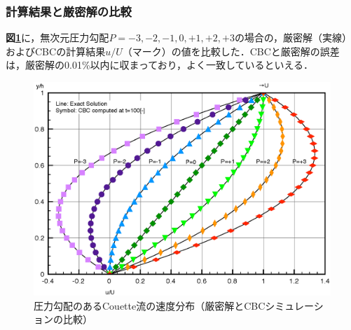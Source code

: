 %
\subsubsection{計算結果と厳密解の比較}
\textbf{図\ref{Fig.couette_exact_100}}に，無次元圧力勾配$P=-3, -2, -1, 0, +1, +2, +3$の場合の，厳密解（実線）およびCBCの計算結果$u/U$（マーク）の値を比較した．CBCと厳密解の誤差は，厳密解の0.01\%以内に収まっており，よく一致しているといえる．


\begin{figure}[htbp]
\begin{center}
\includegraphics[width=14cm]{exact_100.eps}
\end{center}
\caption{圧力勾配のあるCouette流の速度分布（厳密解とCBCシミュレーションの比較）}
\label{Fig.couette_exact_100}
\end{figure}

%
